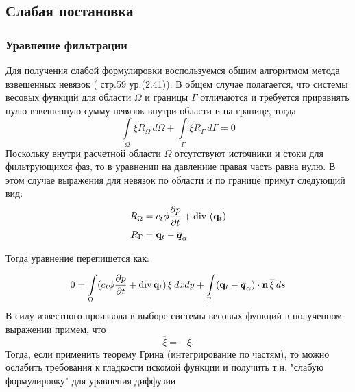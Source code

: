 \subsection{Слабая постановка}


\subsubsection{Уравнение фильтрации}
Для получения слабой формулировки воспользуемся общим алгоритмом метода взвешенных невязок 
(\cite{Zenkevich_1986} стр.59 ур.(2.41)). В общем случае полагается, что системы весовых
функций для области $\Omega$ и границы $\Gamma$ отличаются и требуется приравнять нулю 
взвешенную сумму невязок внутри области и на границе, тогда
 \begin{equation}\label{eq:residuals}
	\int\limits_\Omega \xi R_\Omega \,d\Omega + \int\limits_\Gamma \overline{\xi}R_\Gamma \,d\Gamma = 0
 \end{equation} 
Поскольку внутри расчетной области $\Omega$ отсутствуют источники и стоки для фильтрующихся фаз,
то в уравнении на давлениие  правая часть равна нулю. В этом случае выражения для невязок 
по области и по границе примут следующий вид:
\begin{equation}
	\begin{aligned}
		R_\Omega &= c_t\phi \dfrac{\partial p}{\partial t} + \operatorname{div}\, \left( \mathbf{q}_t \right)\\
		R_\Gamma &= \mathbf{q}_t - \overline{\bm{q}}_{\alpha}
	\end{aligned}
\end{equation}

Тогда уравнение  перепишется как:

\begin{equation}
	\displaystyle 0=\int\limits_\Omega  (c_t\phi \dfrac{\partial p}{\partial t} + \operatorname{div}{\mathbf{q}_t}) \,\xi \,dx dy
	+ \int\limits_{\Gamma} (\mathbf{q}_t - \overline{\bm{q}}_{\alpha})\cdot \mathbf{n} \, \overline{\xi} \,ds
\end{equation}
В силу известного произвола в выборе системы весовых функций в полученном выражении примем, что
\begin{equation}
	\overline{\xi} = -\xi.
\end{equation}
Тогда, если применить теорему Грина (интегрирование по частям), то можно ослабить требования к гладкости
искомой функции и получить т.н. "слабую формулировку" для уравнения  диффузии 

